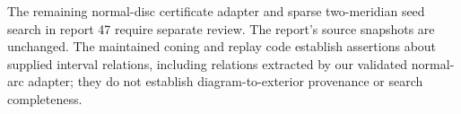 The remaining normal-disc certificate adapter and sparse two-meridian seed
search in report 47 require separate review. The report's source snapshots
are unchanged. The maintained coning and replay code establish assertions
about supplied interval relations, including relations extracted by our
validated normal-arc adapter; they do not establish diagram-to-exterior
provenance or search completeness.
